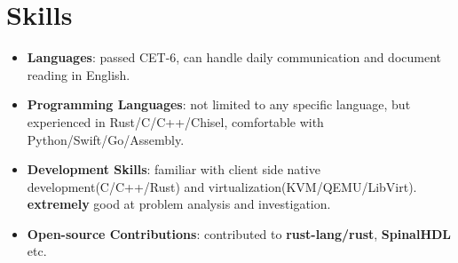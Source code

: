 \documentclass{resume}
\newcommand{\en}[1]{#1}
\newcommand{\zh}[1]{}
\begin{document}
\section{\en{Skills}\zh{技能}}
\begin{itemize}[parsep=0.25ex]
      \item \en{\textbf{Languages}:
                  passed CET-6, can handle daily communication and document reading in English.
            }
            \zh{\textbf{语言}:
                  通过英语六级（525分），可以使用英语进行日常交流以及技术文档的阅读。
            }
      \item \en{\textbf{Programming Languages}:
                  not limited to any specific language,
                  but experienced in Rust/C/C++/Chisel,
                  comfortable with Python/Swift/Go/Assembly.
            }
            \zh{\textbf{编程语言}:
                  不局限于特定编程语言，熟悉 Rust/C/C++/Chisel 等，
                  了解 Scala/Python/Swift/Go/Assembly 等。
            }
      \item \en{\textbf{Development Skills}:
                  familiar with client side native development(C/C++/Rust) and virtualization(KVM/QEMU/LibVirt). \textbf{extremely} good at problem analysis and investigation.
            }
            \zh{\textbf{开发技能}:
                  熟悉客户端 native 开发(C/C++/Rust，全平台)以及虚拟化技术（KVM、QEMU、LibVirt）。了解处理器微结构设计与 FPGA 开发流程。分析定位问题能力尤其突出。
            }
      \item \en{\textbf{Open-source Contributions}:
                  contributed to \textbf{rust-lang/rust}, \textbf{SpinalHDL} etc.
            }
            \zh{\textbf{开源贡献}:
                  为 \textbf{rust-lang/rust}, \textbf{SpinalHDL} 等项目贡献过代码。
            }
\end{itemize}
\end{document}
